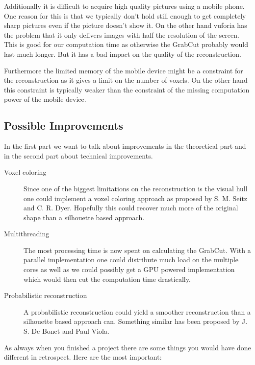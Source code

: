 \documentclass[10pt,twocolumn,letterpaper]{article}
\begin{document}
Additionally it is difficult to acquire high quality pictures using a mobile phone. One reason for this is that we typically don't hold still enough to get completely sharp pictures even if the picture doesn't show it. On the other hand vuforia has the problem that it only delivers images with half the resolution of the screen. This is good for our computation time as otherwise the GrabCut probably would last much longer. But it has a bad impact on the quality of the reconstruction.

Furthermore the limited memory of the mobile device might be a constraint for the reconstruction as it gives a limit on the number of voxels. On the other hand this constraint is typically weaker than the constraint of the missing computation power of the mobile device.

\subsection{Possible Improvements}

In the first part we want to talk about improvements in the theoretical part and in the second part about technical improvements.

\begin{description}
	\item[Voxel coloring] Since one of the biggest limitations on the reconstruction is the visual hull one could implement a voxel coloring approach as proposed by S. M. Seitz and C. R. Dyer. \cite{Seitz} Hopefully this could recover much more of the original shape than a silhouette based approach.
	\item[Multithreading] The most processing time is now spent on calculating the GrabCut. With a parallel implementation one could distribute much load on the multiple cores as well as we could possibly get a GPU powered implementation which would then cut the computation time drastically.
	\item[Probabilistic reconstruction] A probabilistic reconstruction could yield a smoother reconstruction than a silhouette based approach can. Something similar has  been proposed by J. S. De Bonet and Paul Viola. \cite{Bonet}
\end{description}

As always when you finished a project there are some things you would have done different in retrospect. Here are the most important:
\end{document}
